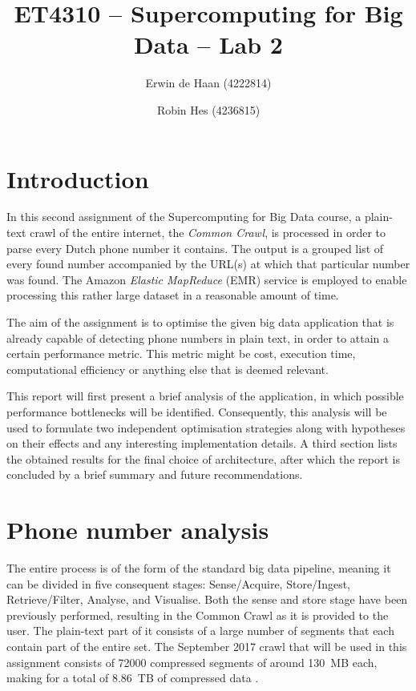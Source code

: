 \documentclass{article}
\title{ET4310 -- Supercomputing for Big Data -- Lab 2}
\author{Erwin de Haan (4222814) \and Robin Hes (4236815)}
\begin{document}
\maketitle
\section{Introduction}
In this second assignment of the Supercomputing for Big Data course, a plain-text crawl of the entire internet, the \emph{Common Crawl}, is processed in order to parse every Dutch phone number it contains.
The output is a grouped list of every found number accompanied by the URL(s) at which that particular number was found.
The Amazon \emph{Elastic MapReduce} (EMR) service is employed to enable processing this rather large dataset in a reasonable amount of time.

The aim of the assignment is to optimise the given big data application that is already capable of detecting phone numbers in plain text, in order to attain a certain performance metric.
This metric might be cost, execution time, computational efficiency or anything else that is deemed relevant.

This report will first present a brief analysis of the application, in which possible performance bottlenecks will be identified.
Consequently, this analysis will be used to formulate two independent optimisation strategies along with hypotheses on their effects and any interesting implementation details.
A third section lists the obtained results for the final choice of architecture, after which the report is concluded by a brief summary and future recommendations.

\section{Phone number analysis}
The entire process is of the form of the standard big data pipeline, meaning it can be divided in five consequent stages: Sense/Acquire, Store/Ingest, Retrieve/Filter, Analyse, and Visualise.
Both the sense and store stage have been previously performed, resulting in the Common Crawl as it is provided to the user.
The plain-text part of it consists of a large number of segments that each contain part of the entire set.
The September 2017 crawl that will be used in this assignment consists of \num{72000} compressed segments of around \SI{130}{MB} each, making for a total of \SI{8.86}{TB} of compressed data \cite{commoncrawl2017september}.
\end{document}
